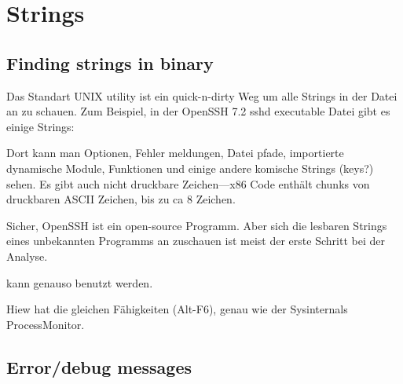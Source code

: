 \section{Strings}
\label{sec:digging_strings}



\subsection{Finding strings in binary}

Das Standart UNIX  utility ist ein quick-n-dirty Weg um alle Strings in der 
Datei an zu schauen. Zum Beispiel, in der OpenSSH 7.2 sshd executable Datei gibt es einige Strings:



Dort kann man Optionen, Fehler meldungen, Datei pfade, importierte dynamische Module, Funktionen und einige andere komische 
Strings (keys?) sehen. Es gibt auch nicht druckbare Zeichen---x86 Code enthält chunks von druckbaren ASCII Zeichen, bis zu ca 8 Zeichen. %


Sicher, OpenSSH ist ein open-source Programm.
Aber sich die lesbaren Strings eines unbekannten Programms an zuschauen ist meist der erste Schritt bei 
der Analyse. 

 kann genauso benutzt werden.

Hiew hat die gleichen Fähigkeiten (Alt-F6), genau wie der Sysinternals ProcessMonitor.

\subsection{Error/debug messages}


